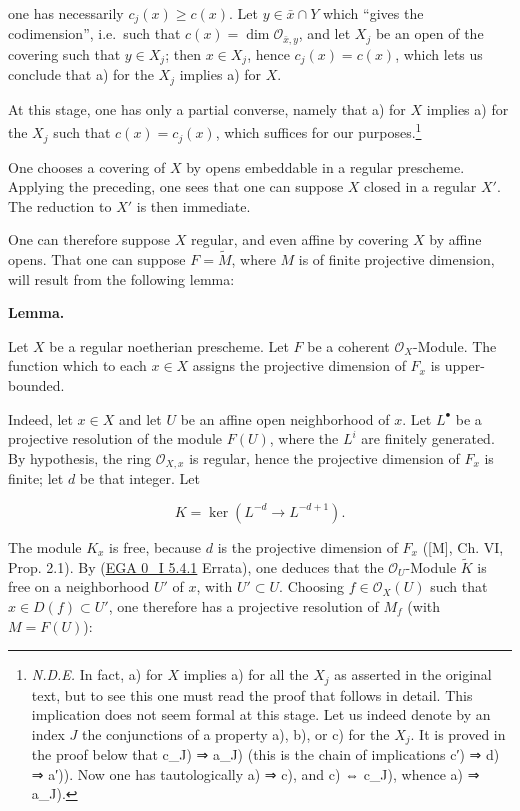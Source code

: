 \documentclass[
  11pt,
  a4paper,
]{book}
\begin{document}
one has necessarily \(c_{j}(x) \geqslant c(x)\). Let
\(y \in \bar{x} \cap Y\) which ``gives the codimension'', i.e.~such that
\(c(x) = \dim \mathcal{O}_{\bar{x}, y}\), and let \(X_{j}\) be an open
of the covering such that \(y \in X_{j}\); then \(x \in
X_{j}\), hence \(c_{j}(x) = c(x)\), which lets us conclude that a) for
the \(X_{j}\) implies a) for \(X\).

At this stage, one has only a partial converse, namely that a) for \(X\)
implies a) for the \(X_{j}\) such that \(c(x) =
c_{j}(x)\), which suffices for our purposes.\footnote{\emph{N.D.E.} In
  fact, a) for \(X\) implies a) for all the \(X_{j}\) as asserted in the
  original text, but to see this one must read the proof that follows in
  detail. This implication does not seem formal at this stage. Let us
  indeed denote by an index \(J\) the conjunctions of a property a), b),
  or c) for the \(X_{j}\). It is proved in the proof below that c\_J) ⇒
  a\_J) (this is the chain of implications c′) ⇒ d) ⇒ a′)). Now one has
  tautologically a) ⇒ c), and c) ⇔ c\_J), whence a) ⇒ a\_J).}

One chooses a covering of \(X\) by opens embeddable in a regular
prescheme. Applying the preceding, one sees that one can suppose \(X\)
closed in a regular \(X'\). The reduction to \(X'\) is then immediate.

One can therefore suppose \(X\) regular, and even affine by covering
\(X\) by affine opens. That one can suppose \(F =
\tilde{M}\), where \(M\) is of finite projective dimension, will result
from the following lemma:

\textbf{Lemma.}

Let \(X\) be a regular noetherian prescheme. Let \(F\) be a coherent
\(\mathcal{O}_{X}\)-Module. The function which to each \(x
\in X\) assigns the projective dimension of \(F_{x}\) is upper-bounded.

Indeed, let \(x \in X\) and let \(U\) be an affine open neighborhood of
\(x\). Let \(L^{\bullet}\) be a projective resolution of the module
\(F(U)\), where the \(L^{i}\) are finitely generated. By hypothesis, the
ring \(\mathcal{O}_{X,x}\) is regular, hence the projective dimension of
\(F_{x}\) is finite; let \(d\) be that integer. Let

\[ K = \ker(L^{-d} \to L^{-d+1}). \]

The module \(K_{x}\) is free, because \(d\) is the projective dimension
of \(F_{x}\) ({[}M{]}, Ch. VI, Prop. 2.1). By
(\href{https://jcreinhold.github.io/ega/i/00-05-quasi-coherent-and-coherent-sheaves.html\#54-locally-free-sheaves}{EGA
0\_I 5.4.1} Errata), one deduces that the \(\mathcal{O}_{U}\)-Module
\(\tilde{K}\) is free on a neighborhood \(U'\) of \(x\), with \(U'
\subset U\). Choosing \(f \in \mathcal{O}_{X}(U)\) such that
\(x \in D(f) \subset U'\), one therefore has a projective resolution of
\(M_{f}\) (with \(M = F(U)\)):
\end{document}
